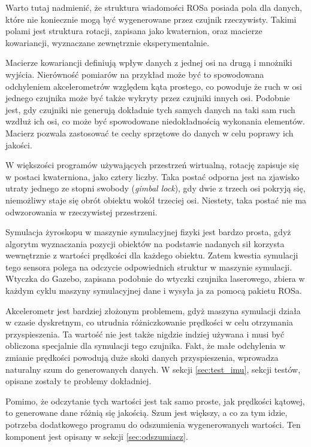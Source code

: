 	Warto tutaj nadmienić, że struktura wiadomości ROSa posiada pola dla danych, które nie koniecznie mogą być wygenerowane przez czujnik rzeczywisty.
	Takimi polami jest struktura rotacji, zapisana jako kwaternion, oraz macierze kowariancji, wyznaczane zewnętrznie eksperymentalnie.
	
	Macierze kowariancji definiują wpływ danych z jednej osi na drugą i mnożniki wyjścia. 
	Nierówność pomiarów na przykład może być to spowodowana odchyleniem akcelerometrów względem kąta prostego, co powoduje że ruch w osi jednego czujnika może
	być także wykryty przez czujniki innych osi. 
	Podobnie jest, gdy czujniki nie generują dokładnie tych samych danych na taki sam ruch wzdłuż ich osi, co może być spowodowane niedokładnością wykonania elementów.
	Macierz pozwala zastosować te cechy sprzętowe do danych w celu poprawy ich jakości.
	
	W większości programów używających przestrzeń wirtualną, rotację zapisuje się w postaci kwaterniona, jako cztery liczby.
	Taka postać odporna jest na zjawisko utraty jednego ze stopni swobody (\emph{gimbal lock}), gdy dwie z trzech osi pokryją się, niemożliwy staje się obrót obiektu wokół trzeciej osi. Niestety, taka postać nie ma odwzorowania w rzeczywistej przestrzeni.
	
	Symulacja żyroskopu w maszynie symulacyjnej fizyki jest bardzo prosta, gdyż algorytm wyznaczania pozycji obiektów na podstawie nadanych sił korzysta wewnętrznie z
	wartości prędkości dla każdego obiektu. Zatem kwestia symulacji tego sensora polega na odczycie odpowiednich struktur w maszynie symulacji.
	Wtyczka do Gazebo, zapisana podobnie do wtyczki czujnika laserowego, zbiera w każdym cyklu maszyny symulacyjnej dane i wysyła ja za pomocą pakietu ROSa.
	
	Akcelerometr jest bardziej złożonym problemem, gdyż maszyna symulacji działa w czasie dyskretnym, co utrudnia różniczkowanie prędkości w celu otrzymania przyspieszenia.
	Ta wartość nie jest także nigdzie indziej używana i musi być obliczona specjalnie dla symulacji tego czujnika.
	Fakt, że małe odchylenia w zmianie prędkości powodują duże skoki danych przyspieszenia, wprowadza naturalny szum do generowanych danych.
	W sekcji \ref{sec:test_imu}, sekcji testów, opisane zostały te problemy dokładniej.
	
	Pomimo, że odczytanie tych wartości jest tak samo proste, jak prędkości kątowej, to generowane dane różnią się jakością.
	Szum jest większy, a co za tym idzie, potrzeba dodatkowego programu do odszumienia wygenerowanych wartości.
	Ten komponent jest opisany w sekcji \ref{sec:odszumiacz}.
	
